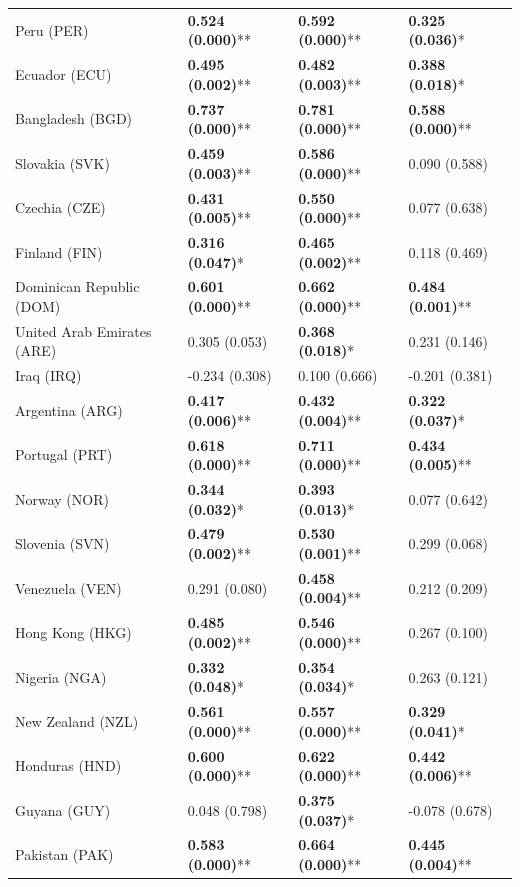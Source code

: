 \begin{longtable}{p{4cm}p{3cm}p{3cm}p{3cm}}
Peru (PER) & \textbf{0.524 (0.000)}** & \textbf{0.592 (0.000)}** & \textbf{0.325 (0.036)}* \\
Ecuador (ECU) & \textbf{0.495 (0.002)}** & \textbf{0.482 (0.003)}** & \textbf{0.388 (0.018)}* \\
Bangladesh (BGD) & \textbf{0.737 (0.000)}** & \textbf{0.781 (0.000)}** & \textbf{0.588 (0.000)}** \\
Slovakia (SVK) & \textbf{0.459 (0.003)}** & \textbf{0.586 (0.000)}** & 0.090 (0.588) \\
Czechia (CZE) & \textbf{0.431 (0.005)}** & \textbf{0.550 (0.000)}** & 0.077 (0.638) \\
Finland (FIN) & \textbf{0.316 (0.047)}* & \textbf{0.465 (0.002)}** & 0.118 (0.469) \\
Dominican Republic (DOM) & \textbf{0.601 (0.000)}** & \textbf{0.662 (0.000)}** & \textbf{0.484 (0.001)}** \\
United Arab Emirates (ARE) & 0.305 (0.053) & \textbf{0.368 (0.018)}* & 0.231 (0.146) \\
Iraq (IRQ) & -0.234 (0.308) & 0.100 (0.666) & -0.201 (0.381) \\
Argentina (ARG) & \textbf{0.417 (0.006)}** & \textbf{0.432 (0.004)}** & \textbf{0.322 (0.037)}* \\
Portugal (PRT) & \textbf{0.618 (0.000)}** & \textbf{0.711 (0.000)}** & \textbf{0.434 (0.005)}** \\
Norway (NOR) & \textbf{0.344 (0.032)}* & \textbf{0.393 (0.013)}* & 0.077 (0.642) \\
Slovenia (SVN) & \textbf{0.479 (0.002)}** & \textbf{0.530 (0.001)}** & 0.299 (0.068) \\
Venezuela (VEN) & 0.291 (0.080) & \textbf{0.458 (0.004)}** & 0.212 (0.209) \\
Hong Kong (HKG) & \textbf{0.485 (0.002)}** & \textbf{0.546 (0.000)}** & 0.267 (0.100) \\
Nigeria (NGA) & \textbf{0.332 (0.048)}* & \textbf{0.354 (0.034)}* & 0.263 (0.121) \\
New Zealand (NZL) & \textbf{0.561 (0.000)}** & \textbf{0.557 (0.000)}** & \textbf{0.329 (0.041)}* \\
Honduras (HND) & \textbf{0.600 (0.000)}** & \textbf{0.622 (0.000)}** & \textbf{0.442 (0.006)}** \\
Guyana (GUY) & 0.048 (0.798) & \textbf{0.375 (0.037)}* & -0.078 (0.678) \\
Pakistan (PAK) & \textbf{0.583 (0.000)}** & \textbf{0.664 (0.000)}** & \textbf{0.445 (0.004)}** \\

\end{longtable}
